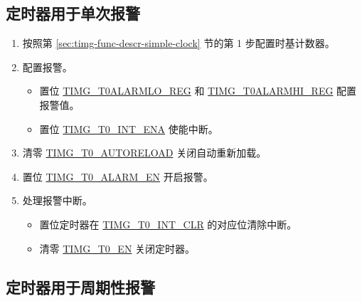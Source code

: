 \documentclass[main\_\_CN.tex]{subfiles}
\begin{document}
\subsection{定时器用于单次报警}\label{sec:timg-func-descr-timer-alarm}
\begin{enumerate}
    \item 按照第 \ref{sec:timg-func-descr-simple-clock} 节的第 1 步配置时基计数器。
    \item 配置报警。
    \begin{itemize}
        \item 置位 \hyperref[regdesc:TIMGTXALARMLOREG]{TIMG\_T0ALARMLO\_REG} 和 \hyperref[regdesc:TIMGTXALARMHIREG]{TIMG\_T0ALARMHI\_REG} 配置报警值。
        \item 置位 \hyperref[fielddesc:TIMGT0INTENA]{TIMG\_T0\_INT\_ENA} 使能中断。
    \end{itemize}
    \item 清零 \hyperref[fielddesc:TIMGTXAUTORELOAD]{TIMG\_T0\_AUTORELOAD} 关闭自动重新加载。
    \item 置位 \hyperref[fielddesc:TIMGTXALARMEN]{TIMG\_T0\_ALARM\_EN} 开启报警。
    \item 处理报警中断。
    \begin{itemize}
        \item 置位定时器在 \hyperref[fielddesc:TIMGT0INTCLR]{TIMG\_T0\_INT\_CLR} 的对应位清除中断。
        \item 清零 \hyperref[fielddesc:TIMGTXEN]{TIMG\_T0\_EN} 关闭定时器。
    \end{itemize}
\end{enumerate}

\subsection{定时器用于周期性报警}
\end{document}
